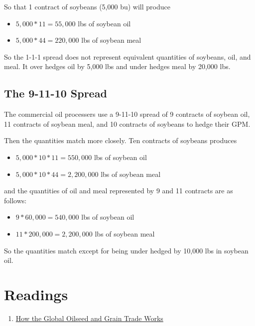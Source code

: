 \documentclass[
]{book}
\providecommand{\tightlist}{%
  \setlength{\itemsep}{0pt}\setlength{\parskip}{0pt}}
\begin{document}
So that 1 contract of soybeans (5,000 bu) will produce

\begin{itemize}
\tightlist
\item
  \(5,000*11 = 55,000\) lbs of soybean oil
\item
  \(5,000*44 = 220,000\) lbs of soybean meal
\end{itemize}

So the 1-1-1 spread does not represent equivalent quantities of soybeans, oil, and meal. It over hedges oil by 5,000 lbs and under hedges meal by 20,000 lbs.

\hypertarget{the-9-11-10-spread}{%
\subsection{The 9-11-10 Spread}\label{the-9-11-10-spread}}

The commercial oil processers use a 9-11-10 spread of 9 contracts of soybean oil, 11 contracts of soybean meal, and 10 contracts of soybeans to hedge their GPM.

Then the quantities match more closely. Ten contracts of soybeans produces

\begin{itemize}
\tightlist
\item
  \(5,000*10*11 = 550,000\) lbs of soybean oil
\item
  \(5,000*10*44 = 2,200,000\) lbs of soybean meal
\end{itemize}

and the quantities of oil and meal represented by 9 and 11 contracts are as follows:

\begin{itemize}
\tightlist
\item
  \(9*60,000 = 540,000\) lbs of soybean oil
\item
  \(11*200,000 = 2,200,000\) lbs of soybean meal
\end{itemize}

So the quantities match except for being under hedged by 10,000 lbs in soybean oil.

\hypertarget{readings-4}{%
\section{Readings}\label{readings-4}}

\begin{enumerate}
\def\labelenumi{\arabic{enumi}.}
\tightlist
\item
  \href{http://unitedsoybean.org/wp-content/uploads/2013/07/RevisedJan12_GlobalOilSeedGrainTrade_2011.pdf}{How the Global Oilseed and Grain Trade Works}
\end{enumerate}
\end{document}
